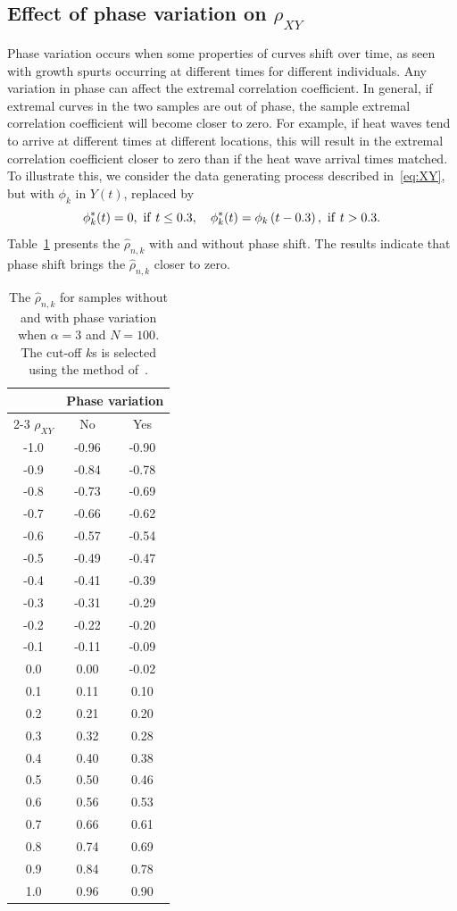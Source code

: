 \documentclass[lineno]{biometrika}
\newcommand \ag{\alpha}
\newcommand\lp{\left (}
\newcommand\rp{\right )}
\begin{document}
\clearpage

\subsection{Effect of phase variation on $\rho_{XY}$} \label{ss:a_phv}

Phase variation occurs when some  properties of curves shift over time, as seen with growth spurts occurring at different times for different individuals. Any variation in phase can affect the extremal correlation coefficient. In general, if extremal curves in the two samples are
out of phase, the sample extremal correlation coefficient will become closer to zero.
For example, if heat
waves tend to arrive at different times at different locations,
this will result in the extremal correlation coefficient closer to zero than if the heat wave
arrival times matched.
To illustrate this, we consider the data generating process described in~\eqref{eq:XY}, but with $\phi_k$ in $Y(t)$, replaced by
\[
\phi_k^*(t) = 0, \ {\rm if} \  t\le 0.3, \quad
\phi_k^*(t) = \phi_k\lp t-0.3\rp, \ {\rm if} \  t> 0.3.
\]
Table~\ref{t:sim8} presents the $\hat{\rho}_{n,k}$
with and without phase shift. The results indicate that phase shift
brings the $\hat{\rho}_{n,k}$ closer to zero.


\begin{table}[ht]
\centering
\caption{The $\hat{\rho}_{n,k}$ for samples without and with phase variation when $\ag=3$ and $N=100$. The cut-off $k$s is selected using the method of~\citet{danielsson:Ergun:deHaan:deVries:2016}.
\label{t:sim8}}
\medskip
\begin{tabular}{ccc}
  \hline\hline
   & \multicolumn{2}{c}{Phase variation}  \\ \cline{2-3}
 $\rho_{XY}$ & No &  Yes \\
  \hline
-1.0 & -0.96 & -0.90\\
-0.9 & -0.84 & -0.78\\
-0.8 & -0.73 & -0.69\\
-0.7 & -0.66 & -0.62\\
-0.6 & -0.57 & -0.54\\
-0.5 & -0.49 & -0.47\\
-0.4 & -0.41 & -0.39\\
-0.3 & -0.31 & -0.29\\
-0.2 & -0.22 & -0.20\\
-0.1 & -0.11 & -0.09\\
0.0 & 0.00 & -0.02 \\
0.1 & 0.11 & 0.10 \\
0.2 & 0.21 & 0.20 \\
0.3 & 0.32 & 0.28 \\
0.4 & 0.40 & 0.38 \\
0.5 & 0.50 & 0.46 \\
0.6 & 0.56 & 0.53 \\
0.7 & 0.66 & 0.61 \\
0.8 & 0.74 & 0.69 \\
0.9 & 0.84 & 0.78 \\
1.0 & 0.96 & 0.90 \\
\hline\hline
\end{tabular}
\end{table}
\end{document}

